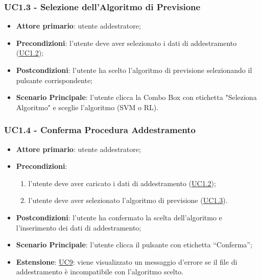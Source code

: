 		\subsubsection{UC1.3 - Selezione dell’Algoritmo di Previsione}
		\begin{itemize}
			\item\textbf{Attore primario}: utente addestratore;
			\item\textbf{Precondizioni}: l’utente deve aver selezionato i dati di addestramento (\hyperref[par:UC1.2]{UC1.2}); 
			\item\textbf{Postcondizioni}: l’utente ha scelto l’algoritmo di previsione selezionando il pulsante corrispondente;
			\item\textbf{Scenario Principale}: l’utente clicca la Combo Box con etichetta "Seleziona Algoritmo" e sceglie l’algoritmo (SVM o RL).
		\end{itemize}
	
	\label{par:UC1.4}
	\subsubsection{UC1.4 - Conferma Procedura Addestramento}
		\begin{itemize}
			\item\textbf{Attore primario}: utente addestratore;
			\item\textbf{Precondizioni}:
				\begin{enumerate}
					\item l’utente deve aver caricato i dati di addestramento (\hyperref[par:UC1.2]{UC1.2});
					\item  l’utente deve aver selezionato l’algoritmo di previsione (\hyperref[par:UC1.3]{UC1.3}).
				\end{enumerate}
			\item\textbf{Postcondizioni}: l’utente ha confermato la scelta dell’algoritmo e l’inserimento dei dati di addestramento;
					
			\item\textbf{Scenario Principale}: l’utente clicca il pulsante con etichetta “Conferma”;
			\item\textbf{Estensione}: \hyperref[par:UC9]{UC9}: viene visualizzato un messaggio d’errore se il file di addestramento è incompatibile con l’algoritmo scelto. 	
		\end{itemize}

	\label{par:UC1.5}
